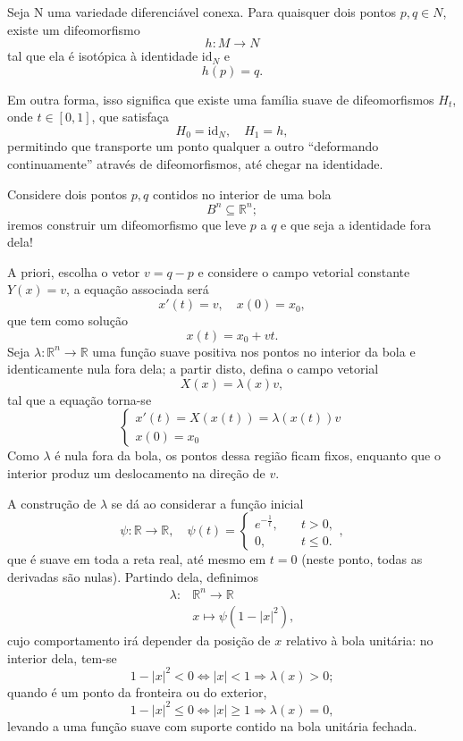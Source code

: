 \documentclass[../differential_topology.tex]{subfiles}
\begin{document}
\hypertarget{homogeneity_lemma}{\begin{lemma*}
		Seja N uma variedade diferenciável conexa. Para quaisquer dois pontos \(p,q\in N\), existe um difeomorfismo
		\[
			h:M\rightarrow N
		\]
		tal que ela é isotópica à identidade \(\mathrm{id}_{N}\) e
		\[
			h(p) = q.
		\]
	\end{lemma*}}
Em outra forma, isso significa que existe uma família suave de difeomorfismos \(H_{t}\), onde \(t\in [0, 1]\), que satisfaça
\[
	H_{0} = \mathrm{id}_{N}, \quad H_{1} = h,
\]
permitindo que transporte um ponto qualquer a outro ``deformando continuamente'' através de difeomorfismos, até chegar na identidade.
\begin{proof*}
	Considere dois pontos \(p, q\) contidos no interior de uma bola
	\[
		B^{n}\subseteq \mathbb{R}^{n};
	\]
	iremos construir um difeomorfismo que leve \(p\) a \(q\) e que seja a identidade fora dela!

	A priori, escolha o vetor \(v=q-p\) e considere o campo vetorial constante \(Y(x) = v\), a equação associada será
	\[
		x'(t)=v, \quad x(0)=x_{0},
	\]
	que tem como solução
	\[
		x(t) = x_{0}+ vt.
	\]
	Seja \(\lambda :\mathbb{R}^{n}\rightarrow \mathbb{R}\) uma função suave positiva nos pontos no interior da bola e identicamente nula fora dela; a partir disto, defina o campo vetorial
	\[
		X(x) = \lambda (x)v,
	\]
	tal que a equação torna-se
	\[
		\left\{\begin{array}{ll}
			x'(t) = X(x(t)) = \lambda (x(t))v \\
			x(0)= x_{0}
		\end{array}\right.
	\]
	Como \(\lambda \) é nula fora da bola, os pontos dessa região ficam fixos, enquanto que o interior produz um deslocamento na direção de \(v\).

	A construção de \(\lambda \) se dá ao considerar a função inicial
	\[
		\psi :\mathbb{R}\rightarrow \mathbb{R}, \quad \psi (t)  = \left\{\begin{array}{ll}
			e^{-\frac{1}{t}}, \quad & t> 0,     \\
			0,                      & t\leq 0 .
		\end{array}\right.,
	\]
	que é suave em toda a reta real, até mesmo em \(t=0\) (neste ponto, todas as derivadas são nulas). Partindo dela, definimos
	\begin{align*}
		\lambda : & \mathbb{R}^{n}\rightarrow\mathbb{R} \\
		          & x\longmapsto \psi (1-| x |^{2}),
	\end{align*}
	cujo comportamento irá depender da posição de \(x\) relativo à bola unitária: no interior dela, tem-se
	\[
		1-| x |^{2} < 0 \Longleftrightarrow | x | < 1 \Rightarrow \lambda (x) > 0;
	\]
	quando é um ponto da fronteira ou do exterior,
	\[
		1-| x |^{2}\leq 0 \Longleftrightarrow | x |\geq 1 \Rightarrow \lambda (x) = 0,
	\]
	levando a uma função suave com suporte contido na bola unitária fechada.


\end{proof*}
\end{document}
